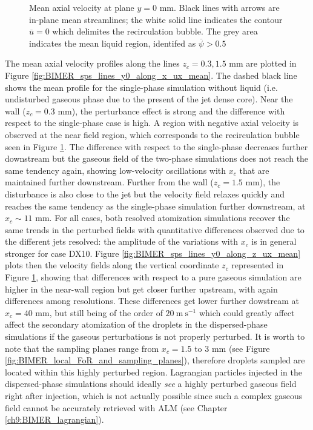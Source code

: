 \vspace*{-0.5in}


\begin{figure}[ht]
\centering
\caption[Mean axial velocity at plane $y = 0$ mm]{Mean axial velocity at plane $y = 0$ mm. Black lines with arrows are in-plane mean streamlines; the white solid line indicates the contour $\overline{u} = 0$ which delimites the recirculation bubble. The grey area indicates the mean liquid region, identifed as $\overline{\psi} > 0.5$}
\label{fig:BIMER_turbulent_structures_plane_y0}
\end{figure}


The mean axial velocity profiles along the lines $z_c = 0.3, 1.5$ mm are plotted in Figure \ref{fig:BIMER_sps_lines_y0_along_x_ux_mean}. The dashed black line shows the mean profile for the single-phase simulation without liquid (i.e. undisturbed gaseous phase due to the present of the jet dense core). Near the wall ($z_c = 0.3$ mm), the perturbance effect is strong and the difference with respect to the single-phase case is high. A region with negative axial velocity is observed at the near field region, which corresponds to the recirculation bubble seen in Figure \ref{fig:BIMER_turbulent_structures_plane_y0}. The difference with respect to the single-phase decreases further downstream but the gaseous field of the two-phase simulations does not reach the same tendency again, showing low-velocity oscillations with $x_c$ that are maintained further downstream. Further from the wall ($z_c = 1.5$ mm), the disturbance is also close to the jet but the velocity field relaxes quickly and reaches the same tendency as the single-phase simulation further downstream, at $x_c \sim 11$ mm. For all cases, both resolved atomization simulations recover the same trends in the perturbed fields with quantitative differences observed due to the different jets resolved: the amplitude of the variations with $x_c$ is in general stronger for case DX10. Figure \ref{fig:BIMER_sps_lines_y0_along_z_ux_mean} plots then the velocity fields along the vertical coordinate $z_c$ represented in Figure \ref{fig:BIMER_turbulent_structures_plane_y0}, showing that differences with respect to a pure gaseous simulation are higher in the near-wall region but get closer further upstream, with again differences among resolutions. These differences get lower further dowstream at $x_c = 40$ mm, but still being of the order of $20~\mathrm{m~s}^{-1}$ which could greatly affect affect the secondary atomization of the droplets in the dispersed-phase simulations if the gaseous perturbations is not properly perturbed. It is worth to note that the sampling planes range from $x_c = 1.5$ to $3$ mm (see Figure \ref{fig:BIMER_local_FoR_and_sampling_planes}), therefore droplets sampled are located within this highly perturbed region. Lagrangian particles injected in the dispersed-phase simulations should ideally \textsl{see} a highly perturbed gaseous field right after injection, which is not actually possible since such a complex gaseous field cannot be accurately retrieved with ALM (see Chapter \ref{ch9:BIMER_lagrangian}).

